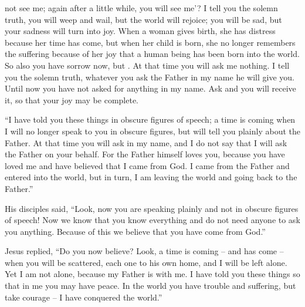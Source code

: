 {not
see
me;
again
after a little while,
you will see
me’?
I tell
you
the solemn truth,
you will weep
and
wail,
but
the world
will rejoice;
you
will be sad,
but
your
sadness
will turn
into
joy.
When
a woman
gives birth,
she has
distress
because
her
time
has come,
but
when
her child
is born,
she
no longer
remembers
the suffering
because of
her joy
that
a human being
has been born
into
the world.
So
also
you
have
sorrow
now,
but
{}.
At
that
time
you will ask
me
nothing.
I tell
you
the solemn truth,
whatever
you ask
the Father
in
my
name
he will give
you.
Until
now
you have
not
asked for
anything
in
my
name.
Ask
and
you will receive
it, so that
your
joy
may be
complete.
\par }{\PP {}“I have told
you
these things
in
obscure figures of speech;
a time
is coming
when
I will
no longer
speak
to you
in
obscure figures,
but
will tell
you
plainly
about
the Father.
At
that
time
you will ask
in
my
name,
and
I do
not
say
that
I
will ask
the Father
on your behalf.
For
the Father
himself
loves
you,
because
you
have loved
me
and
have believed
that
I
came
from
God.
I came
from
the Father
and
entered
into
the world,
but in turn,
I am leaving
the world
and
going back
to
the Father.”
\par }{\PP {}His
disciples
said,
“Look,
now
you are speaking
plainly
and
not
in obscure figures of speech!
Now
we know
that
you know
everything
and
do
not
need
anyone
to
ask
you
anything. Because of this
we believe
that
you have come
from
God.”
\par }{\PP {}Jesus
replied, “Do you
now
believe?
Look,
a time
is coming
– and
has come
– when you will be scattered,
each one
to
his own home,
and I
will be left
alone.
Yet
I am
not
alone,
because
my Father
is
with
me.
I have told
you
these things
so that
in
me
you may have
peace.
In
the world
you have
trouble and suffering,
but
take courage –
I
have conquered
the world.”

}
